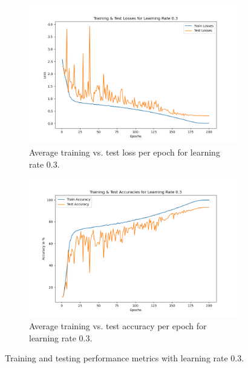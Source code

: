 \begin{figure}[H]
    \centering
    \begin{subfigure}[t]{0.48\textwidth}
        \centering
        \includegraphics[width=\textwidth]{assignment_1/report/images/losses_03.png}
        \caption{Average training vs. test loss per epoch for learning rate 0.3.}
    \end{subfigure}
    \hfill
    \begin{subfigure}[t]{0.48\textwidth}
        \centering
        \includegraphics[width=\textwidth]{assignment_1/report/images/accuracies_03.png}
        \caption{Average training vs. test accuracy per epoch for learning rate 0.3.}
    \end{subfigure}
    \caption{Training and testing performance metrics with learning rate 0.3.}
\end{figure}

